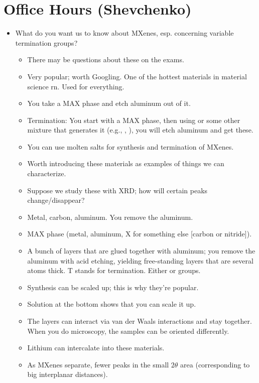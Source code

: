 \documentclass[../notes.tex]{subfiles}
\begin{document}
\section{Office Hours (Shevchenko)}
\begin{itemize}
    \item {}What do you want us to know about MXenes, esp. concerning variable termination groups?
    \begin{itemize}
        \item There may be questions about these on the exams.
        \item Very popular; worth Googling. One of the hottest materials in material science rn. Used for everything.
        \item You take a MAX phase and etch aluminum out of it.
        \item Termination: You start with a MAX phase, then using  or some other mixture that generates it (e.g., , ), you will etch aluminum and get these.
        \item You can use molten salts for synthesis and termination of MXenes.
        \item Worth introducing these materials as examples of things we can characterize.
        \item Suppose we study these with XRD; how will certain peaks change/disappear?
        \item Metal, carbon, aluminum. You remove the aluminum.
        \item MAX phase (metal, aluminum, X for something else [carbon or nitride]).
        \item A bunch of layers that are glued together with aluminum; you remove the aluminum with acid etching, yielding free-standing layers that are several atoms thick. T stands for termination. Either  or  groups.
        \item Synthesis can be scaled up; this is why they're popular.
        \item Solution at the bottom shows that you can scale it up.
        \item The layers can interact via van der Waals interactions and stay together. When you do microscopy, the samples can be oriented differently.
        \item Lithium can intercalate into these materials.
        \item As MXenes separate, fewer peaks in the small $2\theta$ area (corresponding to big interplanar distances).

\end{itemize}
\end{itemize}
\end{document}

